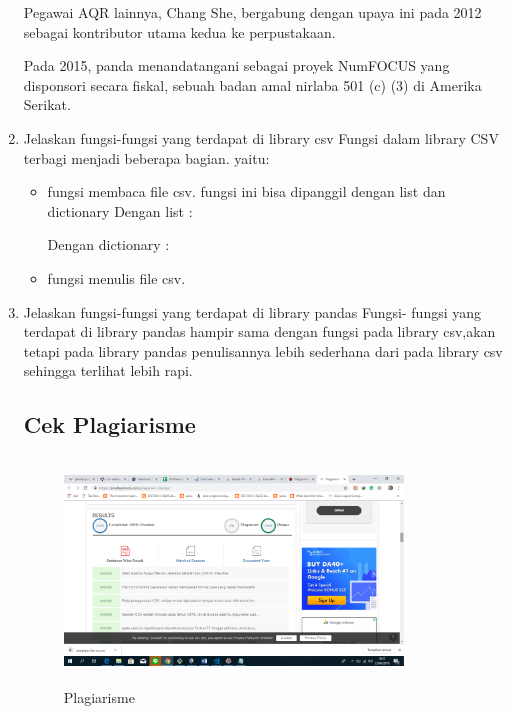 \begin{enumerate}
Pegawai AQR lainnya, Chang She, bergabung dengan upaya ini pada 2012 sebagai kontributor utama kedua ke perpustakaan.

Pada 2015, panda menandatangani sebagai proyek NumFOCUS yang disponsori secara fiskal, sebuah badan amal nirlaba 501 (c) (3) di Amerika Serikat.
	
	
	\item Jelaskan fungsi-fungsi yang terdapat di library csv\newline
 	Fungsi dalam library CSV terbagi menjadi beberapa bagian. yaitu:
	\begin{itemize}
	\item fungsi membaca file csv.
    	fungsi ini bisa dipanggil dengan list dan dictionary
    	Dengan list :
    	
    	Dengan dictionary :
    	
   	 \item fungsi menulis file csv.
    	
	\end{itemize}

	\item Jelaskan fungsi-fungsi yang terdapat di library pandas\newline
	Fungsi- fungsi yang terdapat di library pandas hampir sama dengan fungsi pada library csv,akan tetapi pada library pandas penulisannya lebih sederhana dari pada library csv sehingga terlihat lebih rapi.
    	

\subsection{Cek Plagiarisme}
\begin{figure}[!htbp]
	\centering
	\includegraphics[width=9cm,height=6cm]{figures/nico/Chapter4/plagiarisme.png}
	\caption{Plagiarisme}
	\label{plagiarisme}
\end{figure}
	
\end{enumerate}


